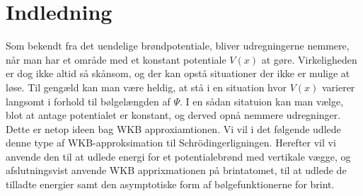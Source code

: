 \section{Indledning}


Som bekendt fra det uendelige brøndpotentiale, bliver udregningerne nemmere, når man har et område med et konstant potentiale $V(x)$ at gøre. Virkeligheden er dog ikke altid så skånsom, og der kan opstå situationer der ikke er mulige at løse. Til gengæld kan man være heldig, at stå i en situation hvor $V(x)$ varierer langsomt i forhold til bølgelængden af $\Psi$. I en sådan sitatuion kan man vælge, blot at antage potentialet er konstant, og derved opnå nemmere udregninger. Dette er netop ideen bag WKB approxiamtionen.
Vi vil i det følgende udlede denne type af WKB-approksimation til Schrödingerligningen. Herefter vil vi anvende den til at udlede energi for et potentialebrønd med vertikale vægge, og afslutningsvist anvende WKB apprixmationen på brintatomet, til at udlede de tilladte energier samt den asymptotiske form af bølgefunktionerne for brint.
